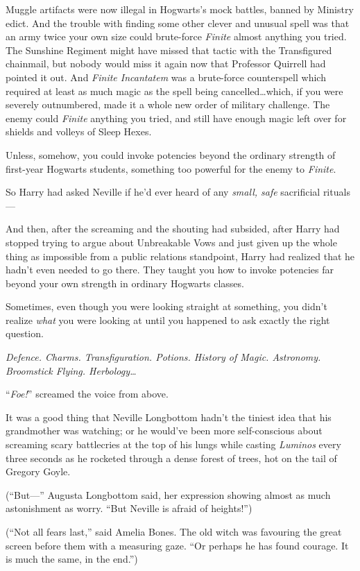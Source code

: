 Muggle artifacts were now illegal in Hogwarts’s mock battles, banned by Ministry edict. And the trouble with finding some other clever and unusual spell was that an army twice your own size could brute-force \emph{Finite} almost anything you tried. The Sunshine Regiment might have missed that tactic with the Transfigured chainmail, but nobody would miss it again now that Professor Quirrell had pointed it out. And \emph{Finite Incantatem} was a brute-force counterspell which required at least as much magic as the spell being cancelled…which, if you were severely outnumbered, made it a whole new order of military challenge. The enemy could \emph{Finite} anything you tried, and still have enough magic left over for shields and volleys of Sleep Hexes.

Unless, somehow, you could invoke potencies beyond the ordinary strength of first-year Hogwarts students, something too powerful for the enemy to \emph{Finite}.

So Harry had asked Neville if he’d ever heard of any \emph{small, safe} sacrificial rituals—

And then, after the screaming and the shouting had subsided, after Harry had stopped trying to argue about Unbreakable Vows and just given up the whole thing as impossible from a public relations standpoint, Harry had realized that he hadn’t even needed to go there. They taught you how to invoke potencies far beyond your own strength in ordinary Hogwarts classes.

Sometimes, even though you were looking straight at something, you didn’t realize \emph{what} you were looking at until you happened to ask exactly the right question.

\emph{Defence. Charms. Transfiguration. Potions. History of Magic. Astronomy. Broomstick Flying. Herbology…}

“\emph{Foe!}” screamed the voice from above.

\later

It was a good thing that Neville Longbottom hadn’t the tiniest idea that his grandmother was watching; or he would’ve been more self-conscious about screaming scary battlecries at the top of his lungs while casting \emph{Luminos} every three seconds as he rocketed through a dense forest of trees, hot on the tail of Gregory Goyle.

(“But—” Augusta Longbottom said, her expression showing almost as much astonishment as worry. “But Neville is afraid of heights!”)

(“Not all fears last,” said Amelia Bones. The old witch was favouring the great screen before them with a measuring gaze. “Or perhaps he has found courage. It is much the same, in the end.”)

